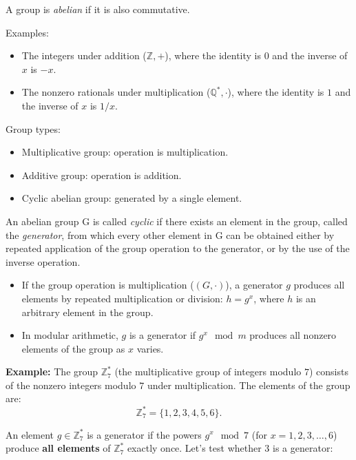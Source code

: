     \begin{defn}
    A group is \emph{abelian} if it is also commutative.
    \end{defn}
    
    Examples:
    \begin{itemize}
        \item The integers under addition (\( \mathbb{Z}, + \)), where the identity is \( 0 \) and the inverse of \( x \) is \( -x \).
        \item The nonzero rationals under multiplication (\( \mathbb{Q}^*, \cdot \)), where the identity is \( 1 \) and the inverse of \( x \) is \( 1/x \).
    \end{itemize}


Group types:
\begin{itemize}
    \item Multiplicative group: operation is multiplication.
    \item Additive group: operation is addition.
    \item Cyclic abelian group: generated by a single element.
\end{itemize}

\begin{defn}
An abelian group G is called \emph{cyclic} if there exists an element in the group, called the \emph{generator}, from which every other element in G can be obtained either by repeated application of the group operation to the generator, or by the use of the inverse operation.
\begin{itemize}
    \item If the group operation is multiplication ($(G, \cdot)$), a generator $g$ produces all elements by repeated multiplication or division: $h = g^x$, where $h$ is an arbitrary element in the group.  
    \item In modular arithmetic, $g$ is a generator if $g^x \mod m $ produces all nonzero elements of the group as $x$ varies.
\end{itemize}
\end{defn}

\textbf{Example:} The group \( \mathbb{Z}_7^* \) (the multiplicative group of integers modulo \( 7 \)) consists of the nonzero integers modulo \( 7 \) under multiplication. The elements of the group are:
\[
\mathbb{Z}_7^* = \{ 1, 2, 3, 4, 5, 6 \}.
\]

An element \( g \in \mathbb{Z}_7^* \) is a generator if the powers \( g^x \mod 7 \) (for \( x = 1, 2, 3, \dots, 6 \)) produce \textbf{all elements} of \( \mathbb{Z}_7^* \) exactly once. Let's test whether \( 3 \) is a generator:

